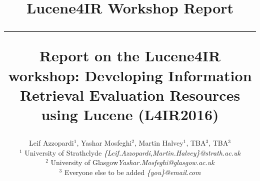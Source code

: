 \documentclass[12pt]{article}
\begin{document}
\title{\vspace{-2.5cm}
\begin{center}
\textbf{\small{Lucene4IR Workshop Report}}\\\vspace{-0.5cm} \rule{17.5cm}{1pt}
\end{center}
\vspace{1cm}\textbf{Report on the Lucene4IR workshop: Developing Information Retrieval Evaluation Resources using Lucene (L4IR2016) }}

\newcommand{\todo}[1]{\textcolor{red}{#1}}
\author{
Leif Azzopardi$^{1}$, Yashar Mosfeghi$^{2}$, Martin Halvey$^{1}$, TBA$^{3}$, TBA$^{3}$\\
    $^{1}$  University of Strathclyde  \emph{\small \{Leif.Azzopardi,Martin.Halvey\}@strath.ac.uk}\\
    $^{2}$ University of Glasgow\emph{\small Yashar.Mosfeghi@glasgow.ac.uk}\\
    $^{3}$ Everyone else to be added \emph{\small \{you\}@email.com}
}
\end{document}
